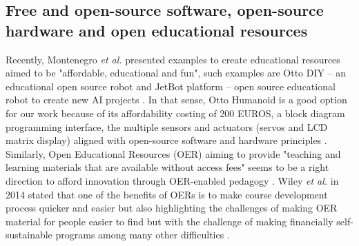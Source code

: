 \documentclass[conference]{IEEEtran}
\newcommand{\etal}{\textit{et al. }} %
\begin{document}
\subsection{Free and open-source software, open-source hardware and open educational resources}
Recently, Montenegro \etal presented examples to create educational resources aimed to be "affordable, educational and fun", such examples are Otto DIY -- an educational open source robot and JetBot platform -- open source educational robot to create new AI projects \cite{montenegro2021air4children}.
In that sense, Otto Humanoid is a good option for our work because of its affordability costing of 200 EUROS, a block diagram programming interface, the multiple sensors and actuators (servos and LCD matrix display) aligned with open-source software and hardware principles \cite{OttoDIY:2016}.
Similarly, Open Educational Resources (OER) aiming to provide "teaching and learning materials that are available without access fees" seems to be a right direction to afford innovation through OER-enabled pedagogy \cite{Clinton-Lisell2021}.
Wiley \etal in 2014 stated that one of the benefits of OERs is to make course development process quicker and easier but also highlighting the challenges of making OER material for people easier to find but with the challenge of making financially self-sustainable programs among many other difficulties \cite{Wiley2014}.
\end{document}
